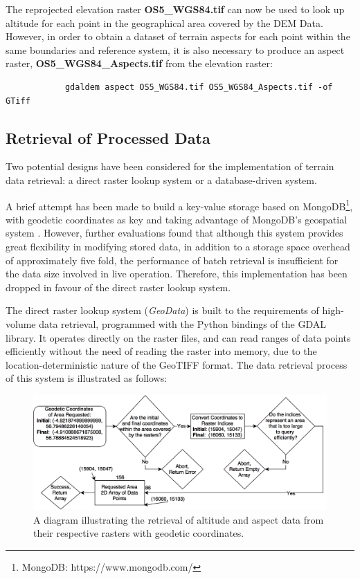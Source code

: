\documentclass[11pt, oneside]{article}
\begin{document}
		The reprojected elevation raster \textbf{OS5\_WGS84.tif} can now be used to look up altitude for each point in the geographical area covered by the DEM Data. However, in order to obtain a dataset of terrain aspects for each point within the same boundaries and reference system, it is also necessary to produce an aspect raster, \textbf{OS5\_WGS84\_Aspects.tif} from the elevation raster:
		\begin{verbatim}
			gdaldem aspect OS5_WGS84.tif OS5_WGS84_Aspects.tif -of GTiff
		\end{verbatim}
		
	\subsection{Retrieval of Processed Data}
		Two potential designs have been considered for the implementation of terrain data retrieval: a direct raster lookup system or a database-driven system. 
		
		A brief attempt has been made to build a key-value storage based on MongoDB\footnote{MongoDB: https://www.mongodb.com/}, with geodetic coordinates as key and taking advantage of MongoDB's geospatial system \cite{mongodb-spatial}. However, further evaluations found that although this system provides great flexibility in modifying stored data, in addition to a storage space overhead of approximately five fold, the performance of batch retrieval is insufficient for the data size involved in live operation. Therefore, this implementation has been dropped in favour of the direct raster lookup system.
		
		The direct raster lookup system (\textit{GeoData}) is built to the requirements of high-volume data retrieval, programmed with the Python bindings of the GDAL library. It operates directly on the raster files, and can read ranges of data points efficiently without the need of reading the raster into memory, due to the location-deterministic nature of the GeoTIFF format.  The data retrieval process of this system is illustrated as follows:
		\begin{figure}[h]
		\centering
		\includegraphics[scale=0.3]{Retrieval.png}
		\caption{A diagram illustrating the retrieval of altitude and aspect data from their respective rasters with geodetic coordinates.}
		\end{figure}
		
\end{document}

